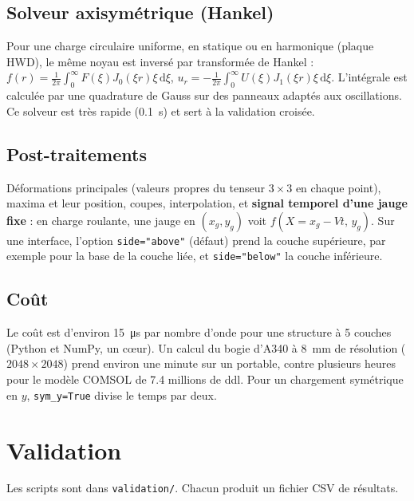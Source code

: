 \documentclass[11pt,a4paper]{article}
\newcommand{\dd}{\mathrm{d}}
\begin{document}
\subsection{Solveur axisymétrique (Hankel)}
Pour une charge circulaire uniforme, en statique ou en harmonique (plaque HWD), le même noyau est
inversé par transformée de Hankel :
$f(r)=\frac1{2\pi}\int_0^\infty F(\xi)J_0(\xi r)\xi\,\dd\xi$,
$u_r=-\frac1{2\pi}\int_0^\infty U(\xi)J_1(\xi r)\xi\,\dd\xi$.
L'intégrale est calculée par une quadrature de Gauss sur des panneaux adaptés aux oscillations.
Ce solveur est très rapide (\SI{0.1}{s}) et sert à la validation croisée.

\subsection{Post-traitements}
Déformations principales (valeurs propres du tenseur $3\times3$ en chaque point), maxima et leur
position, coupes, interpolation, et \textbf{signal temporel d'une jauge fixe} :
en charge roulante, une jauge en $(x_g,y_g)$ voit $f(X=x_g-Vt,\,y_g)$.
Sur une interface, l'option \texttt{side="above"} (défaut) prend la couche supérieure, par exemple
pour la base de la couche liée, et \texttt{side="below"} la couche inférieure.

\subsection{Coût}
Le coût est d'environ \SI{15}{\micro s} par nombre d'onde pour une structure à 5 couches (Python
et NumPy, un c\oe ur). Un calcul du bogie d'A340 à \SI{8}{mm} de résolution
($2048\times2048$) prend environ une minute sur un portable, contre plusieurs heures pour le
modèle COMSOL de \num{7.4} millions de ddl. Pour un chargement symétrique en $y$,
\texttt{sym\_y=True} divise le temps par deux.

\section{Validation}
Les scripts sont dans \texttt{validation/}. Chacun produit un fichier CSV de résultats.
\end{document}

